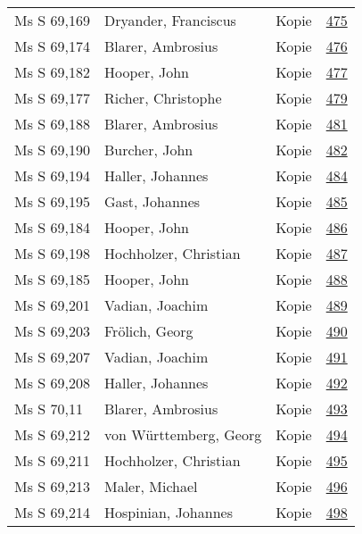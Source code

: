 \documentclass[10pt,a4paper,landscape]{report}
\begin{document}
\begin{longtable}{p{16cm}p{4cm}lr}
Ms S 69,169	&	Dryander, Franciscus	&	Kopie	&	\href{http://130.60.24.72/assignment/475}{475}\\
Ms S 69,174	&	Blarer, Ambrosius	&	Kopie	&	\href{http://130.60.24.72/assignment/476}{476}\\
Ms S 69,182	&	Hooper, John	&	Kopie	&	\href{http://130.60.24.72/assignment/477}{477}\\
Ms S 69,177	&	Richer, Christophe	&	Kopie	&	\href{http://130.60.24.72/assignment/479}{479}\\
Ms S 69,188	&	Blarer, Ambrosius	&	Kopie	&	\href{http://130.60.24.72/assignment/481}{481}\\
Ms S 69,190	&	Burcher, John	&	Kopie	&	\href{http://130.60.24.72/assignment/482}{482}\\
Ms S 69,194	&	Haller, Johannes	&	Kopie	&	\href{http://130.60.24.72/assignment/484}{484}\\
Ms S 69,195	&	Gast, Johannes	&	Kopie	&	\href{http://130.60.24.72/assignment/485}{485}\\
Ms S 69,184	&	Hooper, John	&	Kopie	&	\href{http://130.60.24.72/assignment/486}{486}\\
Ms S 69,198	&	Hochholzer, Christian	&	Kopie	&	\href{http://130.60.24.72/assignment/487}{487}\\
Ms S 69,185	&	Hooper, John	&	Kopie	&	\href{http://130.60.24.72/assignment/488}{488}\\
Ms S 69,201	&	Vadian, Joachim	&	Kopie	&	\href{http://130.60.24.72/assignment/489}{489}\\
Ms S 69,203	&	Frölich, Georg	&	Kopie	&	\href{http://130.60.24.72/assignment/490}{490}\\
Ms S 69,207	&	Vadian, Joachim	&	Kopie	&	\href{http://130.60.24.72/assignment/491}{491}\\
Ms S 69,208	&	Haller, Johannes	&	Kopie	&	\href{http://130.60.24.72/assignment/492}{492}\\
Ms S 70,11	&	Blarer, Ambrosius	&	Kopie	&	\href{http://130.60.24.72/assignment/493}{493}\\
Ms S 69,212	&	von Württemberg, Georg	&	Kopie	&	\href{http://130.60.24.72/assignment/494}{494}\\
Ms S 69,211	&	Hochholzer, Christian	&	Kopie	&	\href{http://130.60.24.72/assignment/495}{495}\\
Ms S 69,213	&	Maler, Michael	&	Kopie	&	\href{http://130.60.24.72/assignment/496}{496}\\
Ms S 69,214	&	Hospinian, Johannes	&	Kopie	&	\href{http://130.60.24.72/assignment/498}{498}\\

\end{longtable}
\end{document}
